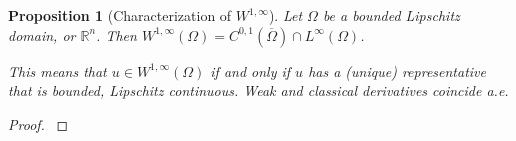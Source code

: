 \documentclass[english,a4paper,9pt,oneside]{scrbook}	%
\theoremstyle{break}
\newtheorem{lemma}[equation]{Lemma}
\newtheorem{prop}[equation]{Proposition}
\newenvironment{mproof}[1][\proofname]{%
  \begin{proof}[#1]$ $\par\nobreak\ignorespaces
}{%
  \end{proof}
}
\renewcommand*{\proofname}{Proof}
\theoremstyle{remark}
\newcommand{\mR}{\mathbb{R}}
\newcommand{\norm}[1]{\left\lVert#1\right\rVert}
\begin{document}
\begin{appendices}
%
%
%
%
%
%
%
%

\begin{prop}[Characterization of $W^{1,\infty}$]
\label{prop:lip}
Let $\Omega$ be a bounded Lipschitz domain, or $\mathbb{R}^n$. Then $W^{1,\infty}(\Omega) = C^{0,1}(\overline{\Omega})\cap L^\infty(\Omega)$.

This means that $u\in W^{1,\infty}(\Omega)$ if and only if $u$ has a (unique) representative that is bounded, Lipschitz continuous. Weak and classical derivatives coincide a.e.
\end{prop}
\begin{mproof}


\end{mproof}
\end{appendices}
\end{document}
